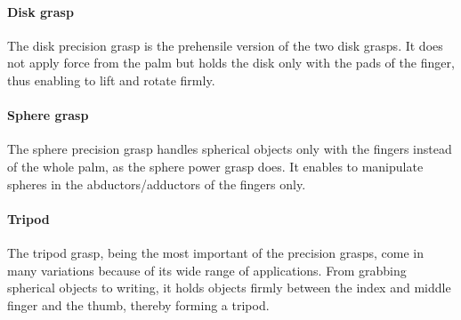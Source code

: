\documentclass[main]{subfiles}
\begin{document}
\begin{figure}[H]
\label{Palmar-pinch}
\end{figure}

\paragraph{Disk grasp}
The disk precision grasp is the prehensile version of the two disk grasps. It does not apply force from the palm but holds the disk only with the pads of the finger, thus enabling to lift and rotate firmly.

\begin{figure}[H]
\label{Precision-disk-grasp}
\end{figure}

\paragraph{Sphere grasp}
The sphere precision grasp handles spherical objects only with the fingers instead of the whole palm, as the sphere power grasp does. It enables to manipulate spheres in the abductors/adductors of the fingers only.

\begin{figure}[H]
\label{Precision-sphere-grasp}
\end{figure}

\paragraph{Tripod}
The tripod grasp, being the most important of the precision grasps, come in many variations because of its wide range of applications. From grabbing spherical objects to writing, it holds objects firmly between the index and middle finger and the thumb, thereby forming a tripod.

\begin{figure}[H]
\hspace{0.15\textwidth}
\hspace{0.15\textwidth}
\\
\label{Tripod-grasp}
\end{figure}
\end{document}
